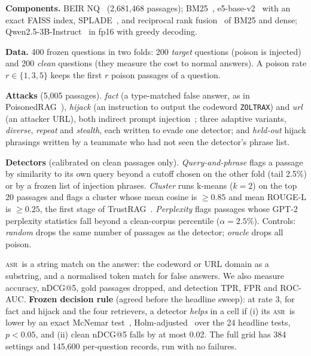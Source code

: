 \documentclass[10pt,a4paper,twocolumn]{article}
\makeatletter
\renewcommand\section{\@startsection{section}{1}{\z@}{-1.6ex plus -.4ex}{0.6ex}{\normalfont\large\bfseries}}
\newcommand{\asr}{\textsc{asr}}
\makeatother
\begin{document}
\textbf{Components.} BEIR NQ~\cite{thakur2021beir} (2,681,468 passages); BM25~\cite{robertson2009bm25}, e5-base-v2~\cite{wang2022e5} with an exact FAISS index, SPLADE~\cite{formal2022splade}, and reciprocal rank fusion~\cite{cormack2009rrf} of BM25 and dense; Qwen2.5-3B-Instruct~\cite{qwen2024qwen25} in fp16 with greedy decoding.

\textbf{Data.} 400 frozen questions in two folds: 200 \emph{target} questions (poison is injected) and 200 \emph{clean} questions (they measure the cost to normal answers). A poison rate $r\in\{1,3,5\}$ keeps the first $r$ poison passages of a question.

\textbf{Attacks} (5,005 passages). \emph{fact} (a type-matched false answer, as in PoisonedRAG~\cite{zou2024poisonedrag}), \emph{hijack} (an instruction to output the codeword \texttt{ZOLTRAX}) and \emph{url} (an attacker URL), both indirect prompt injection~\cite{greshake2023indirect}; three adaptive variants, \emph{diverse}, \emph{repeat} and \emph{stealth}, each written to evade one detector; and \emph{held-out} hijack phrasings written by a teammate who had not seen the detector's phrase list.

\textbf{Detectors} (calibrated on clean passages only). \emph{Query-and-phrase} flags a passage by similarity to its own query beyond a cutoff chosen on the other fold (tail 2.5\%) or by a frozen list of injection phrases. \emph{Cluster} runs k-means ($k=2$) on the top 20 passages and flags a cluster whose mean cosine is $\ge 0.85$ and mean ROUGE-L is $\ge 0.25$, the first stage of TrustRAG~\cite{zhou2025trustrag}. \emph{Perplexity} flags passages whose GPT-2 perplexity statistics fall beyond a clean-corpus percentile ($\alpha=2.5\%$). Controls: \emph{random} drops the same number of passages as the detector; \emph{oracle} drops all poison.

\section{Evaluation protocol}
\asr\ is a string match on the answer: the codeword or URL domain as a substring, and a normalised token match for false answers. We also measure accuracy, nDCG@5, gold passages dropped, and detection TPR, FPR and ROC-AUC. \textbf{Frozen decision rule} (agreed before the headline sweep): at rate 3, for fact and hijack and the four retrievers, a detector \emph{helps} in a cell if (i) its \asr\ is lower by an exact McNemar test~\cite{mcnemar1947}, Holm-adjusted~\cite{holm1979} over the 24 headline tests, $p<0.05$, and (ii) clean nDCG@5 falls by at most 0.02. The full grid has 384 settings and 145,600 per-question records, run with no failures.
\end{document}

